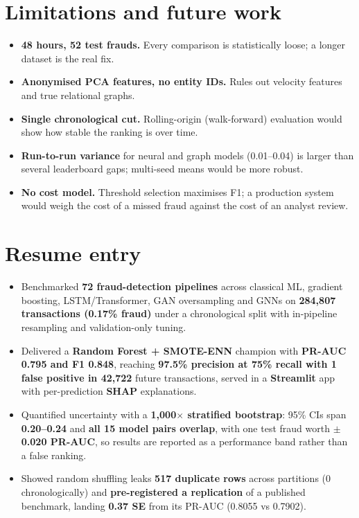 \documentclass[11pt,a4paper]{article}
\begin{document}
\section{Limitations and future work}
\begin{itemize}[leftmargin=1.0cm]
\item \textbf{48 hours, 52 test frauds.} Every comparison is statistically loose; a longer dataset is
the real fix.
\item \textbf{Anonymised PCA features, no entity IDs.} Rules out velocity features and true relational
graphs.
\item \textbf{Single chronological cut.} Rolling-origin (walk-forward) evaluation would show how stable
the ranking is over time.
\item \textbf{Run-to-run variance} for neural and graph models (0.01--0.04) is larger than
several leaderboard gaps; multi-seed means would be more robust.
\item \textbf{No cost model.} Threshold selection maximises F1; a production system would weigh the
cost of a missed fraud against the cost of an analyst review.
\end{itemize}

\section{Resume entry}
\begingroup\small
{}
\begin{itemize}[leftmargin=0.8cm,itemsep=2pt]
\item Benchmarked \textbf{72 fraud-detection pipelines} across classical ML, gradient boosting, LSTM/Transformer, GAN oversampling and GNNs on \textbf{284,807 transactions (0.17\% fraud)} under a chronological split with in-pipeline resampling and validation-only tuning.
\item Delivered a \textbf{Random Forest + SMOTE-ENN} champion with \textbf{PR-AUC 0.795 and F1 0.848}, reaching \textbf{97.5\% precision at 75\% recall with 1 false positive in 42,722} future transactions, served in a \textbf{Streamlit} app with per-prediction \textbf{SHAP} explanations.
\item Quantified uncertainty with a \textbf{1,000$\times$ stratified bootstrap}: 95\% CIs span \textbf{0.20--0.24} and \textbf{all 15 model pairs overlap}, with one test fraud worth \textbf{$\pm$0.020 PR-AUC}, so results are reported as a performance band rather than a false ranking.
\item Showed random shuffling leaks \textbf{517 duplicate rows} across partitions (0 chronologically) and \textbf{pre-registered a replication} of a published benchmark, landing \textbf{0.37 SE} from its PR-AUC (0.8055 vs 0.7902).
\end{itemize}
\endgroup
\end{document}
